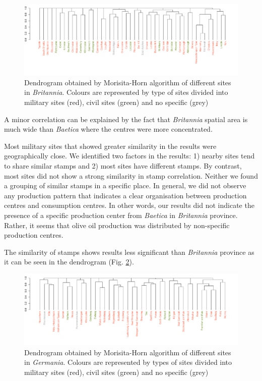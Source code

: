 \documentclass[review]{elsarticle}
\newcommand{\memo}[2]{\textcolor{#1}{#2}}
\newcommand{\xavi}[1]{\memo{magenta}{XRC: #1\\}}
\begin{document}

\begin{figure}
	\centering
\includegraphics[width=\linewidth]{figs/dendrobrit5.pdf}
\caption{Dendrogram obtained by Morisita-Horn algorithm of different sites in \textit{Britannia}. Colours are represented by type of sites divided into military sites (red), civil sites (green) and no specific (grey)}
\label{britmap}
\end{figure}


A minor correlation can be explained by the fact that \textit{Britannia} spatial area is much wide than \textit{Baetica} where the centres were more concentrated.

Most military sites that showed greater similarity in the results were geographically close. We identified two factors in the results: 1) nearby sites tend to share similar stamps and 2) most sites have different stamps. 
By contrast, most sites did not show a strong similarity in stamp correlation. Neither we found a grouping of similar stamps in a specific place. In general, we did not observe any production pattern that indicates a clear organisation between production centres and consumption centres. In other words, our results did not indicate the presence of a specific production center from \textit{Baetica} in \textit{Britannia} province. Rather, it seems that olive oil production was distributed by non-specific production centres. 


The similarity of stamps shows results less significant than \textit{Britannia} province as it can be seen in the dendrogram (Fig. \ref{germap}). 

\begin{figure}
	\centering
\includegraphics[width=\linewidth]{figs/dendroger5.pdf}
\caption{Dendrogram obtained by Morisita-Horn algorithm of different sites in \textit{Germania}. Colours are represented by types of sites divided into military sites (red), civil sites (green) and no specific (grey)}
\label{germap}
\end{figure}
\end{document}
